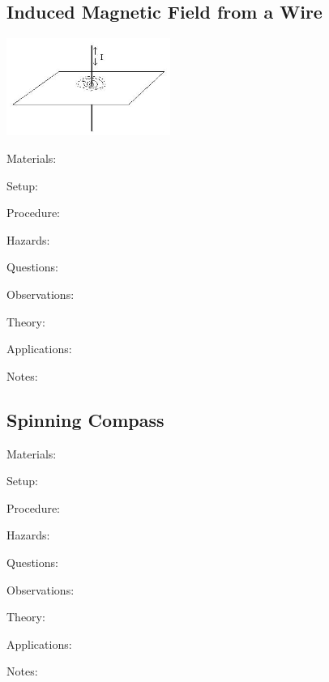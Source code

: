 \begin{multicols}{2}
\subsection{Induced Magnetic Field from a Wire}

\begin{center}
\includegraphics[width=0.4\textwidth]{./img/induced-mag-field-wire.png}
\end{center}

\begin{description*}
\item[Materials:]{}
\item[Setup:]{}
\item[Procedure:]{}
\item[Hazards:]{}
\item[Questions:]{}
\item[Observations:]{}
\item[Theory:]{}
\item[Applications:]{}
\item[Notes:]{}
\end{description*}

\subsection{Spinning Compass}


\begin{description*}
\item[Materials:]{}
\item[Setup:]{}
\item[Procedure:]{}
\item[Hazards:]{}
\item[Questions:]{}
\item[Observations:]{}
\item[Theory:]{}
\item[Applications:]{}
\item[Notes:]{}
\end{description*}


\end{multicols}
